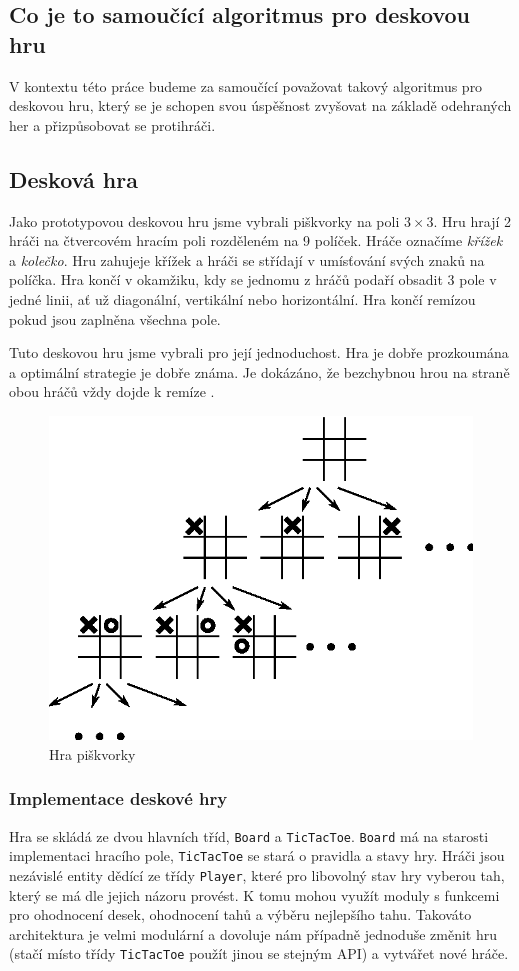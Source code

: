 \documentclass[12pt]{article}
\begin{document}
\subsection*{Co je to samoučící algoritmus pro deskovou hru}
V kontextu této práce budeme za samoučící považovat takový algoritmus pro deskovou hru, který se je schopen svou úspěšnost zvyšovat na základě odehraných her a přizpůsobovat se protihráči. 
\subsection{Desková hra}
Jako prototypovou deskovou hru jsme vybrali piškvorky na poli $3 \times 3$. Hru hrají 2 hráči na čtvercovém hracím poli rozděleném na 9 políček. Hráče označíme \emph{křížek} a \emph{kolečko}. Hru zahujeje křížek a hráči se střídají v umís\v{t}ování svých znaků na políčka. Hra končí v okamžiku, kdy se jednomu z hráčů podaří obsadit 3 pole v jedné linii, a\v{t} už diagonální, vertikální nebo horizontální. Hra končí remízou pokud jsou zaplněna všechna pole.

Tuto deskovou hru jsme vybrali pro její jednoduchost. Hra je dobře prozkoumána a optimální strategie je dobře známa. Je dokázáno, že bezchybnou hrou na straně obou hráčů vždy dojde k remíze \cite{ostermiller} \cite{tictactoegames}. 
\begin{figure}[btp]\caption{Hra piškvorky} \label{fig:tictactoe-gametree}
	\centering
	\includegraphics{tictactoe_game_tree}
\end{figure}

\subsubsection{Implementace deskové hry}
Hra se skládá ze dvou hlavních tříd, \texttt{Board} a \texttt{TicTacToe}. \texttt{Board} má na starosti implementaci hracího pole, \texttt{TicTacToe} se stará o pravidla a stavy hry. Hráči jsou nezávislé entity dědící ze třídy \texttt{Player}, které pro libovolný stav hry vyberou tah, který se má dle jejich názoru provést. K tomu mohou využít moduly s funkcemi pro ohodnocení desek, ohodnocení tahů a výběru nejlepšího tahu. Takováto architektura je velmi modulární a dovoluje nám případně jednoduše změnit hru (stačí místo třídy \texttt{TicTacToe} použít jinou se stejným API) a vytvářet nové hráče.
\end{document}
